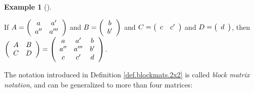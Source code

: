 \documentclass[numbers=enddot,12pt,final,onecolumn,notitlepage]{scrartcl}%
\numberwithin{exer}{subsection}
\theoremstyle{definition}
\newtheorem{exam}[theo]{Example}
\newenvironment{example}[1][]
{\begin{exam}[#1]\begin{leftbar}}
{\end{leftbar}\end{exam}}
\begin{document}
\begin{example}
If $A=\left(
\begin{array}
[c]{cc}%
a & a^{\prime}\\
a^{\prime\prime} & a^{\prime\prime\prime}%
\end{array}
\right)  $ and $B=\left(
\begin{array}
[c]{c}%
b\\
b^{\prime}%
\end{array}
\right)  $ and $C=\left(
\begin{array}
[c]{cc}%
c & c^{\prime}%
\end{array}
\right)  $ and $D=\left(
\begin{array}
[c]{c}%
d
\end{array}
\right)  $, then $\left(
\begin{array}
[c]{cc}%
A & B\\
C & D
\end{array}
\right)  =\left(
\begin{array}
[c]{ccc}%
a & a^{\prime} & b\\
a^{\prime\prime} & a^{\prime\prime\prime} & b^{\prime}\\
c & c^{\prime} & d
\end{array}
\right)  $.
\end{example}

The notation introduced in Definition \ref{def.blockmats.2x2} is called
\emph{block matrix notation}, and can be generalized to more than four matrices:
\end{document}
